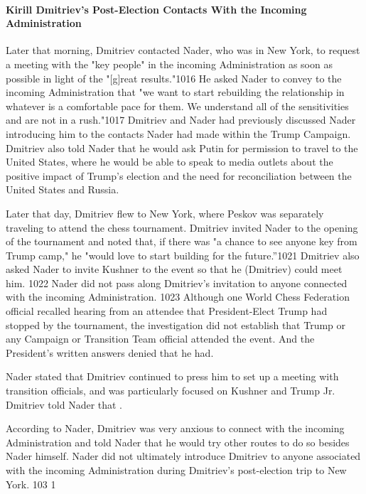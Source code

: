 \paragraph{Kirill Dmitriev's Post-Election Contacts With the Incoming Administration}

Later that morning, Dmitriev contacted Nader, who was in New York, to request a meeting with the "key people" in the incoming Administration as soon as possible in light of the "[g]reat results."1016 He asked Nader to convey to the incoming Administration that "we want to start rebuilding the relationship in whatever is a comfortable pace for them. We understand all of the sensitivities and are not in a rush."1017 Dmitriev and Nader had previously discussed Nader introducing him to the contacts Nader had made within the Trump Campaign.%
Dmitriev also told Nader that he would ask Putin for permission to travel to the United States, where he would be able to speak to media outlets about the positive impact of Trump's election and the need for reconciliation between the United States and Russia.%

Later that day, Dmitriev flew to New York, where Peskov was separately traveling to attend the chess tournament.%
Dmitriev invited Nader to the opening of the tournament and noted that, if there was "a chance to see anyone key from Trump camp," he "would love to start building for the future.''1021 Dmitriev also asked Nader to invite Kushner to the event so that he (Dmitriev) could meet him. 1022 Nader did not pass along Dmitriev's invitation to anyone connected with the incoming Administration. 1023 Although one World Chess Federation official recalled hearing from an attendee that President-Elect Trump had stopped by the tournament, the investigation did not establish that Trump or any Campaign or Transition Team official attended the event.%
And the President's written answers denied that he had.%

Nader stated that Dmitriev continued to press him to set up a meeting with transition officials, and was particularly focused on Kushner and Trump Jr.%
Dmitriev told Nader that .

According to Nader, Dmitriev was very anxious to connect with the incoming Administration and told Nader that he would try other routes to do so besides Nader himself.%
Nader did not ultimately introduce Dmitriev to anyone associated with the incoming Administration during Dmitriev's post-election trip to New York. 103 1

